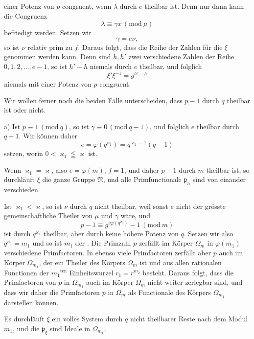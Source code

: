 einer Potenz von $p$ congruent, wenn $\lambda$ durch $e$ theilbar ist. Denn nur dann kann die Congruenz
\[ \lambda \equiv \gamma x \, (\mathrm{mod}\ \mu) \]
befriedigt werden. Setzen wir
\[ \gamma = e \nu, \]
so ist $\nu$ relativ prim zu $f$. Daraus folgt, dass die Reihe der Zahlen
für die $\xi$ genommen werden kann. Denn sind $h, h'$ zwei verschiedene Zahlen der Reihe $0, 1, 2, \ldots, e-1$, so ist $h'-h$ niemals durch $e$ theilbar, und folglich
\[ \xi' \xi^{-1} = g^{h'-h} \]
niemals mit einer Potenz von $p$ congruent.

Wir wollen ferner noch die beiden Fälle unterscheiden, dass $p-1$ durch $q$ theilbar ist oder nicht.

a) Ist $p \equiv 1 \, (\mathrm{mod}\ q)$, so ist $\gamma \equiv 0 \, (\mathrm{mod}\ q-1)$, und folglich $e$ theilbar durch $q-1$. Wir können daher
\[ e = \varphi(q^{\varkappa_1}) = q^{\varkappa_1 - 1}(q-1) \]
setzen, worin $0 < \varkappa_1 \leqq \varkappa$ ist.

Wenn $\varkappa_1 = \varkappa$, also $e = \varphi(m)$, $f=1$, und daher $p-1$ durch $m$ theilbar ist, so durchläuft $\xi$ die ganze Gruppe $\mathfrak{N}$, und alle Primfunctionale $\mathfrak{p}_n$ sind von einander verschieden.

Ist $\varkappa_1 < \varkappa$, so ist $\nu$ durch $q$ nicht theilbar, weil sonst $e$ nicht der grösste gemeinschaftliche Theiler von $\mu$ und $\gamma$ wäre, und
\[ p - 1 \equiv g^{\nu\varphi(q^{\varkappa_1})} - 1 \, (\mathrm{mod}\ m) \]
ist durch $q^{\varkappa_1}$ theilbar, aber durch keine höhere Potenz von $q$. Setzen wir also $q^{\varkappa_1} = m_1$ und
so ist $m_1$ der . Die Primzahl $p$ zerfällt im Körper $\Omega_m$ in $\varphi(m_1)$ verschiedene Primfactoren. In ebenso viele Primfactoren zerfällt aber $p$ auch im Körper $\Omega_{m_1}$, der ein Theiler des Körpers $\Omega_m$ ist und aus allen rationalen Functionen der $m_1{}^{\mathrm{ten}}$ Einheitswurzel $r_1 = r^{m_2}$ besteht. Daraus folgt, dass die Primfactoren von $p$ in $\Omega_{m_1}$ auch im Körper $\Omega_m$ nicht weiter zerlegbar sind, und dass wir daher die Primfactoren $p$ in $\Omega_m$ als Functionale des Körpers $\Omega_{m_1}$ darstellen können.

Es durchläuft $\xi$ ein volles System durch $q$ nicht theilbarer Reste nach dem Modul $m_1$, und die $\mathfrak{p}_\xi$ sind Ideale in $\Omega_{m_1}$.
